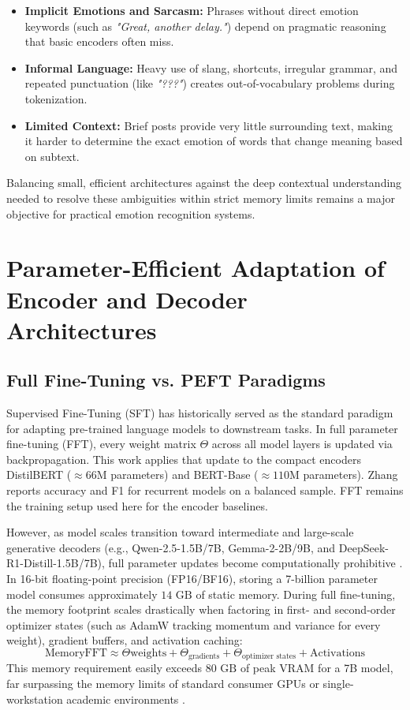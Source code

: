 \documentclass[conference]{IEEEtran}
\begin{document}
\begin{itemize}
    \item \textbf{Implicit Emotions and Sarcasm:} Phrases without direct emotion keywords (such as \textit{"Great, another delay."}) depend on pragmatic reasoning that basic encoders often miss.
    \item \textbf{Informal Language:} Heavy use of slang, shortcuts, irregular grammar, and repeated punctuation (like \textit{"???"}) creates out-of-vocabulary problems during tokenization.
    \item \textbf{Limited Context:} Brief posts provide very little surrounding text, making it harder to determine the exact emotion of words that change meaning based on subtext.
\end{itemize}

Balancing small, efficient architectures against the deep contextual understanding needed to resolve these ambiguities within 
strict memory limits remains a major objective for practical emotion recognition systems.

\section{Parameter-Efficient Adaptation of Encoder and Decoder Architectures}
\label{sec:ejeB}

\subsection{Full Fine-Tuning vs. PEFT Paradigms}
Supervised Fine-Tuning (SFT) has historically served as the standard paradigm for adapting pre-trained language models to downstream tasks. In full parameter fine-tuning (FFT), every weight matrix $\Theta$ across all model layers is updated via backpropagation. This work applies that update to the compact encoders DistilBERT ($\approx 66\text{M}$ parameters) and BERT-Base ($\approx 110\text{M}$ parameters). Zhang \cite{zhang2024comparative} reports accuracy and F1 for recurrent models on a balanced sample. FFT remains the training setup used here for the encoder baselines.

However, as model scales transition toward intermediate and large-scale generative decoders (e.g., Qwen-2.5-1.5B/7B, Gemma-2-2B/9B, and DeepSeek-R1-Distill-1.5B/7B), full parameter updates become computationally prohibitive \cite{liu-etal-2026-look}. In 16-bit floating-point precision (FP16/BF16), storing a 7-billion parameter model consumes approximately $14\text{ GB}$ of static memory. During full fine-tuning, the memory footprint scales drastically when factoring in first- and second-order optimizer states (such as AdamW tracking momentum and variance for every weight), gradient buffers, and activation caching:
\begin{equation}
\text{Memory}{\text{FFT}} \approx \Theta{\text{weights}} + \Theta_{\text{gradients}} + \Theta_{\text{optimizer states}} + \text{Activations}
\end{equation}
This memory requirement easily exceeds $80\text{ GB}$ of peak VRAM for a 7B model, far surpassing the memory limits of standard consumer GPUs or single-workstation academic environments \cite{nwaiwu2025peft}.
\end{document}
